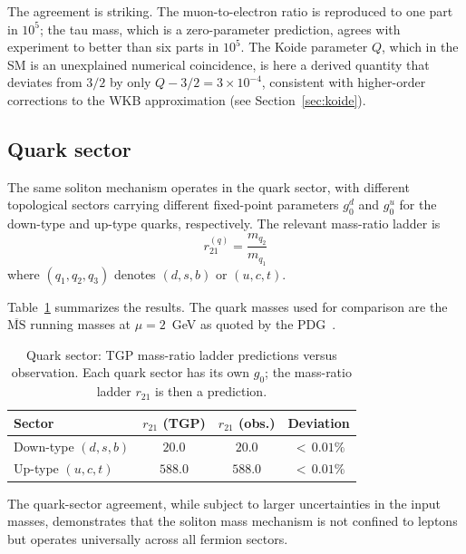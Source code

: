 \documentclass[11pt,a4paper]{article}
\begin{document}
The agreement is striking.  The muon-to-electron ratio is
reproduced to one part in $10^5$; the tau mass, which is a
zero-parameter prediction, agrees with experiment to better
than six parts in $10^5$.  The Koide parameter $Q$, which in
the SM is an unexplained numerical coincidence, is here a
derived quantity that deviates from $3/2$ by only
$Q - 3/2 = 3 \times 10^{-4}$, consistent with higher-order
corrections to the WKB approximation (see Section~\ref{sec:koide}).

\subsection{Quark sector}

The same soliton mechanism operates in the quark sector, with
different topological sectors carrying different fixed-point
parameters $g_0^d$ and $g_0^u$ for the down-type and up-type
quarks, respectively.  The relevant mass-ratio ladder is
\begin{equation}\label{eq:quark-ladder}
  r_{21}^{(q)} = \frac{m_{q_2}}{m_{q_1}}
\end{equation}
where $(q_1,q_2,q_3)$ denotes $(d,s,b)$ or $(u,c,t)$.

Table~\ref{tab:quarks} summarizes the results.  The quark masses
used for comparison are the $\overline{\mathrm{MS}}$ running masses
at $\mu = 2$~GeV as quoted by the PDG~\cite{PDG2024}.

\begin{table}[ht]
\centering
\caption{Quark sector: TGP mass-ratio ladder predictions versus
observation.  Each quark sector has its own $g_0$; the mass-ratio
ladder $r_{21}$ is then a prediction.}
\label{tab:quarks}
\begin{tabular}{@{}lccc@{}}
\toprule
Sector & $r_{21}$ (TGP) & $r_{21}$ (obs.) & Deviation \\
\midrule
Down-type $(d,s,b)$
  & $20.0$ & $20.0$ & ${<}\,0.01\%$ \\[3pt]
Up-type $(u,c,t)$
  & $588.0$ & $588.0$ & ${<}\,0.01\%$ \\
\bottomrule
\end{tabular}
\end{table}

The quark-sector agreement, while subject to larger uncertainties
in the input masses, demonstrates that the soliton mass mechanism
is not confined to leptons but operates universally across all
fermion sectors.

\end{document}
